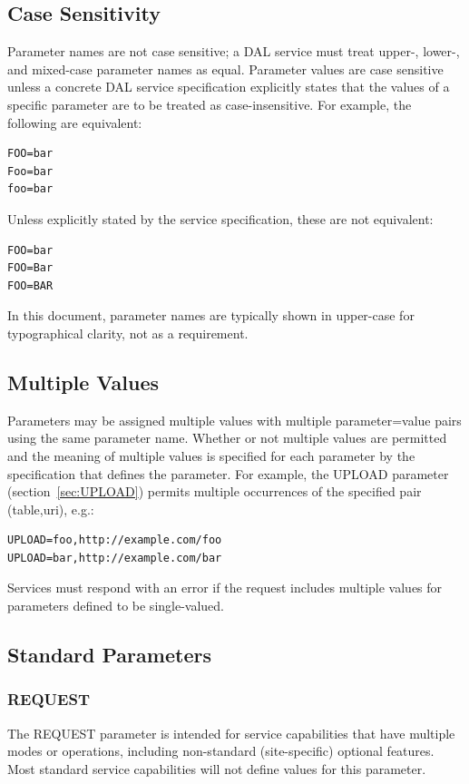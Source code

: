 \documentclass[11pt,letter]{ivoa}
\begin{document}
\subsection{Case Sensitivity}
Parameter names are not case sensitive; a DAL service must treat
\hbox{upper-,} \hbox{lower-,}
and mixed-case parameter names as equal. Parameter values are case sensitive
unless a concrete DAL service specification explicitly states that the values of
a specific parameter are to be treated as case-insensitive. For example, the
following are equivalent:

\begin{verbatim}
FOO=bar
Foo=bar
foo=bar
\end{verbatim}

Unless explicitly stated by the service specification, these are not equivalent:

\begin{verbatim}
FOO=bar
FOO=Bar
FOO=BAR
\end{verbatim}

In this document, parameter names are typically shown in upper-case for
typographical clarity, not as a requirement.

\subsection{Multiple Values}
Parameters may be assigned multiple values with multiple parameter=value pairs
using the same parameter name. Whether or not multiple values are permitted and
the meaning of multiple values is specified for each parameter by the
specification that defines the parameter. For example, the UPLOAD parameter
(section~\ref{sec:UPLOAD}) permits multiple occurrences of the specified
pair (table,uri), e.g.:

\begin{verbatim}
UPLOAD=foo,http://example.com/foo
UPLOAD=bar,http://example.com/bar
\end{verbatim}

Services must respond with an error if the request includes multiple values for
parameters defined to be single-valued.

\subsection{Standard Parameters}

\subsubsection{REQUEST}
\label{sec:REQUEST}
The REQUEST parameter is intended for service capabilities that have
multiple modes or operations, including non-standard (site-specific) optional
features. Most standard service capabilities will not define values for this
parameter.
\end{document}
